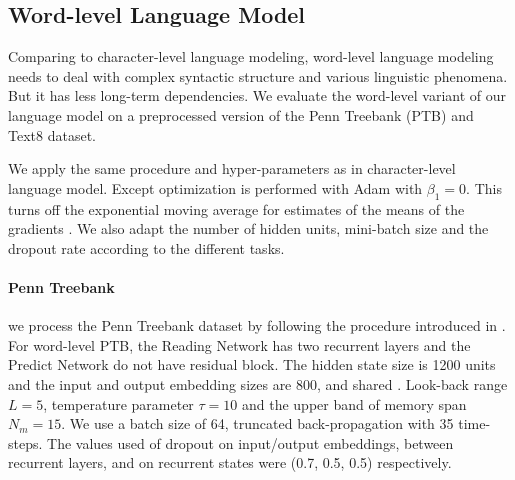 \documentclass{article} \usepackage{iclr2018_conference,times}
\begin{document}
\subsection{Word-level Language Model}
Comparing to character-level language modeling, word-level language modeling needs to deal with complex syntactic structure and various linguistic phenomena. But it has less long-term dependencies. We evaluate the word-level variant of our language model on a preprocessed version of the Penn Treebank (PTB) \citep{marcus1993building} and Text8 \citep{mahoney2011large} dataset.

We apply the same procedure and hyper-parameters as in character-level language model. Except optimization is performed with Adam with $\beta_1 = 0$. This turns off the exponential moving average for estimates of the means of the gradients \citep{melis2017state}. We also adapt the number of hidden units, mini-batch size and the dropout rate according to the different tasks. 

\paragraph{Penn Treebank} we process the Penn Treebank dataset \citep{mikolov2012subword} by following the procedure introduced in \citep{mikolov2010recurrent}. For word-level PTB, the Reading Network has two recurrent layers and the Predict Network do not have residual block. The hidden state size is 1200 units and the input and output embedding sizes are 800, and shared \citep{inan2016tying, E17-2025}. Look-back range $L=5$, temperature parameter $\tau = 10$ and the upper band of memory span $N_m=15$. We use a batch size of 64, truncated back-propagation with 35 time-steps. The values used of dropout on input/output embeddings, between recurrent layers, and on recurrent states were (0.7, 0.5, 0.5) respectively.
\end{document}
